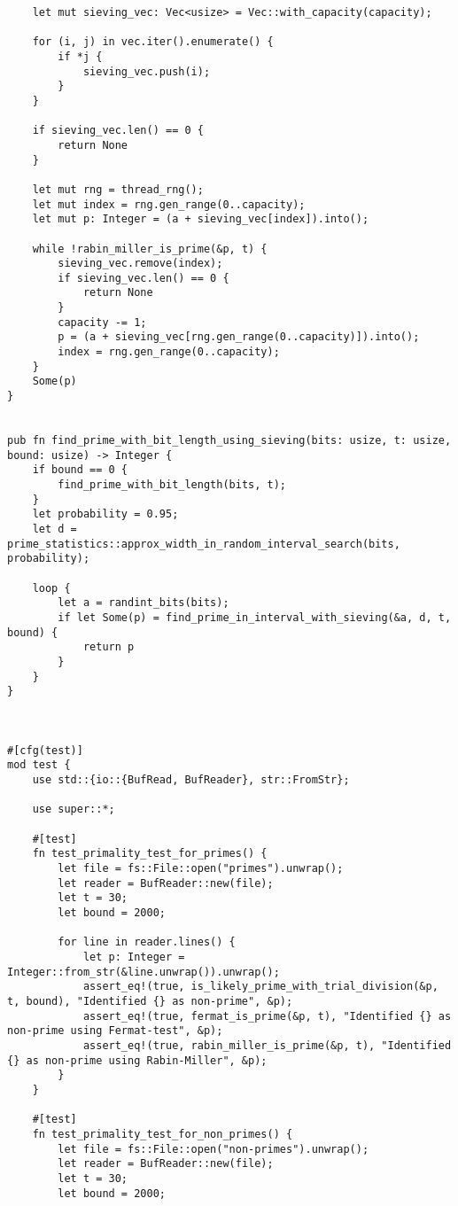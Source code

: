 \begin{verbatim}
    let mut sieving_vec: Vec<usize> = Vec::with_capacity(capacity);   

    for (i, j) in vec.iter().enumerate() {
        if *j {
            sieving_vec.push(i);
        }
    }

    if sieving_vec.len() == 0 {
        return None
    }

    let mut rng = thread_rng();
    let mut index = rng.gen_range(0..capacity);
    let mut p: Integer = (a + sieving_vec[index]).into();

    while !rabin_miller_is_prime(&p, t) {
        sieving_vec.remove(index);
        if sieving_vec.len() == 0 {
            return None
        }
        capacity -= 1;
        p = (a + sieving_vec[rng.gen_range(0..capacity)]).into();
        index = rng.gen_range(0..capacity);
    }
    Some(p)
}


pub fn find_prime_with_bit_length_using_sieving(bits: usize, t: usize, bound: usize) -> Integer {
    if bound == 0 {
        find_prime_with_bit_length(bits, t);
    }
    let probability = 0.95;
    let d = prime_statistics::approx_width_in_random_interval_search(bits, probability);
    
    loop {
        let a = randint_bits(bits);
        if let Some(p) = find_prime_in_interval_with_sieving(&a, d, t, bound) {
            return p
        }
    }
}



#[cfg(test)]
mod test {
    use std::{io::{BufRead, BufReader}, str::FromStr};

    use super::*;

    #[test]
    fn test_primality_test_for_primes() {
        let file = fs::File::open("primes").unwrap();
        let reader = BufReader::new(file);
        let t = 30;
        let bound = 2000;

        for line in reader.lines() {
            let p: Integer = Integer::from_str(&line.unwrap()).unwrap();
            assert_eq!(true, is_likely_prime_with_trial_division(&p, t, bound), "Identified {} as non-prime", &p);
            assert_eq!(true, fermat_is_prime(&p, t), "Identified {} as non-prime using Fermat-test", &p);
            assert_eq!(true, rabin_miller_is_prime(&p, t), "Identified {} as non-prime using Rabin-Miller", &p);
        }
    }

    #[test]
    fn test_primality_test_for_non_primes() {
        let file = fs::File::open("non-primes").unwrap();
        let reader = BufReader::new(file);
        let t = 30;
        let bound = 2000;


\end{verbatim}
